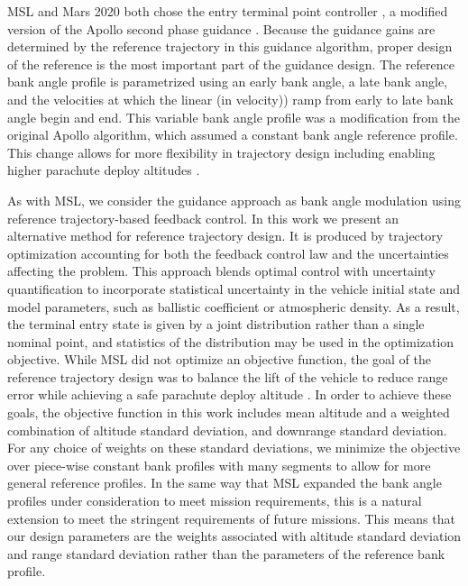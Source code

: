 \documentclass[journal ]{new-aiaa}
\begin{document}
MSL and Mars 2020 both chose the entry terminal point controller \cite{MSL_EDL, M2020_EDL}, a modified version of the Apollo second phase guidance \cite{MSL_EDL2}. Because the guidance gains are determined by the reference trajectory in this guidance algorithm, proper design of the reference is the most important part of the guidance design. The reference bank angle profile is parametrized using an early bank angle, a late bank angle, and the velocities at which the linear (in velocity)) ramp from early to late bank angle begin and end. This variable bank angle profile was a modification from the original Apollo algorithm, which assumed a constant bank angle reference profile. This change allows for more flexibility in trajectory design including enabling higher parachute deploy altitudes \cite{MSL_EDL2}.

As with MSL, we consider the guidance approach as bank angle modulation using reference trajectory-based feedback control. In this work we present an alternative method for reference trajectory design. It is produced by trajectory optimization accounting for both the feedback control law and the uncertainties affecting the problem. This approach blends optimal control with uncertainty quantification to incorporate statistical uncertainty in the vehicle initial state and model parameters, such as ballistic coefficient or atmospheric density. As a result, the terminal entry state is given by a joint distribution rather than a single nominal point, and statistics of the distribution may be used in the optimization objective. While MSL did not optimize an objective function, the goal of the reference trajectory design was to balance the lift of the vehicle to reduce range error while achieving a safe parachute deploy altitude \cite{MSL_EDL2}. In order to achieve these goals, the objective function in this work includes mean altitude and a weighted combination of altitude standard deviation, and downrange standard deviation. For any choice of weights on these standard deviations, we minimize the objective over piece-wise constant bank profiles with many segments to allow for more general reference profiles. In the same way that MSL expanded the bank angle profiles under consideration to meet mission requirements, this is a natural extension to meet the stringent requirements of future missions. This means that our design parameters are the weights associated with altitude standard deviation and range standard deviation rather than the parameters of the reference bank profile. 
\end{document}
